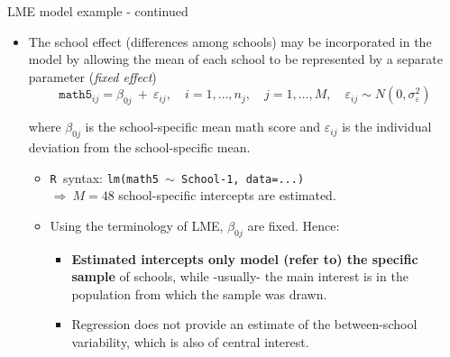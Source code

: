 \documentclass{beamer}
\newcommand{\Rko}{\texttt{R~}}
\begin{document}
\begin{frame}{LME model example - continued}
\begin{itemize}
\item The school effect (differences among schools) may be incorporated in the model by allowing the mean of each school to be represented by a separate parameter (\textit{fixed effect})
$$ \texttt{math5}_{ij} = \beta_{0j}~+~\varepsilon_{ij}, \quad i=1,\dots,n_j,  \quad j=1,\dots, M,  \quad \varepsilon_{ij} \sim N(0,\sigma^2_{\varepsilon}) $$

where $\beta_{0j}$ is the school-specific mean math score and
$\varepsilon_{ij}$ is the individual deviation from the school-specific mean.\\
\smallskip
\begin{itemize}
\item \Rko syntax: \texttt{lm(math5 $\sim$ School-1, data=...)}\\
$\Rightarrow~M=48$ school-specific intercepts are estimated.\\
\medskip
\item Using the terminology of LME, $\beta_{0j}$ are fixed. Hence:\\
\begin{itemize}
    \item \textbf{Estimated intercepts only model (refer to) the specific sample}  of schools, while -usually- the main interest is in the population from which the sample was drawn. \smallskip
    \item Regression does not provide an estimate of the between-school variability, which is also of central interest.
\end{itemize}
\end{itemize}
\end{itemize}
\end{frame}
\end{document}
